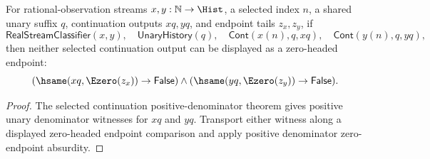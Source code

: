 \begin{theorem}
\label{thm:real-stream-classifier-selected-continuation-e0-endpoint-absurd}
For rational-observation streams $x,y:\mathbb{N}\to\Hist$, a selected index
$n$, a shared unary suffix $q$, continuation outputs $xq,yq$, and endpoint
tails $z_x,z_y$, if
$$
\mathsf{RealStreamClassifier}(x,y),\quad
\mathsf{UnaryHistory}(q),\quad
\mathsf{Cont}(x(n),q,xq),\quad
\mathsf{Cont}(y(n),q,yq),
$$
then neither selected continuation output can be displayed as a zero-headed
endpoint:
$$
(\hsame(xq,\Ezero(z_x))\to\mathsf{False})\land
(\hsame(yq,\Ezero(z_y))\to\mathsf{False}).
$$
\end{theorem}
\begin{proof}
The selected continuation positive-denominator theorem gives positive unary
denominator witnesses for $xq$ and $yq$. Transport either witness along a
displayed zero-headed endpoint comparison and apply positive denominator
zero-endpoint absurdity.
\end{proof}

